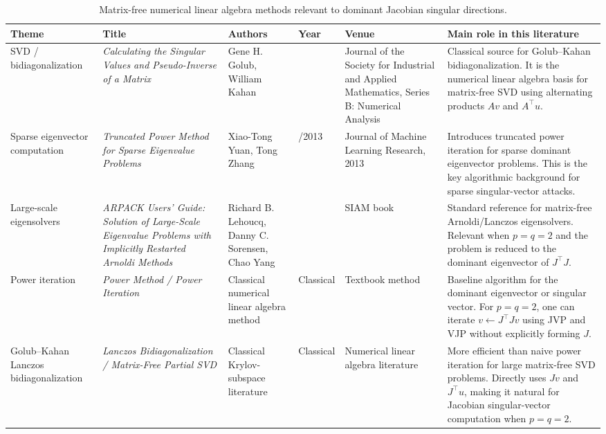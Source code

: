 \documentclass{article}
\begin{document}
\begin{landscape}
\begin{table}[p]
\centering
\footnotesize
\begin{tabular}{>{\raggedright\arraybackslash}p{2.4cm} >{\raggedright\arraybackslash}p{4.0cm} >{\raggedright\arraybackslash}p{3.4cm} >{\raggedright\arraybackslash}p{1.0cm} >{\raggedright\arraybackslash}p{3.2cm} >{\raggedright\arraybackslash}p{6.2cm}}
\hline
\textbf{Theme} & \textbf{Title} & \textbf{Authors} & \textbf{Year} & \textbf{Venue} & \textbf{Main role in this literature} \\
\hline
SVD / bidiagonalization &
\textit{Calculating the Singular Values and Pseudo-Inverse of a Matrix} &
Gene H. Golub, William Kahan &
1965 &
Journal of the Society for Industrial and Applied Mathematics, Series B: Numerical Analysis &
Classical source for Golub--Kahan bidiagonalization. It is the numerical linear algebra basis for matrix-free SVD using alternating products \(Av\) and \(A^\top u\). \\
\hline
Sparse eigenvector computation &
\textit{Truncated Power Method for Sparse Eigenvalue Problems} &
Xiao-Tong Yuan, Tong Zhang &
2011/2013 &
Journal of Machine Learning Research, 2013 &
Introduces truncated power iteration for sparse dominant eigenvector problems. This is the key algorithmic background for sparse singular-vector attacks. \\
\hline
Large-scale eigensolvers &
\textit{ARPACK Users' Guide: Solution of Large-Scale Eigenvalue Problems with Implicitly Restarted Arnoldi Methods} &
Richard B. Lehoucq, Danny C. Sorensen, Chao Yang &
1998 &
SIAM book &
Standard reference for matrix-free Arnoldi/Lanczos eigensolvers. Relevant when \(p=q=2\) and the problem is reduced to the dominant eigenvector of \(J^\top J\). \\
\hline
Power iteration &
\textit{Power Method / Power Iteration} &
Classical numerical linear algebra method &
Classical &
Textbook method &
Baseline algorithm for the dominant eigenvector or singular vector. For \(p=q=2\), one can iterate \(v \leftarrow J^\top Jv\) using JVP and VJP without explicitly forming \(J\). \\
\hline
Golub--Kahan Lanczos bidiagonalization &
\textit{Lanczos Bidiagonalization / Matrix-Free Partial SVD} &
Classical Krylov-subspace literature &
Classical &
Numerical linear algebra literature &
More efficient than naive power iteration for large matrix-free SVD problems. Directly uses \(Jv\) and \(J^\top u\), making it natural for Jacobian singular-vector computation when \(p=q=2\). \\
\hline
\end{tabular}
\caption{Matrix-free numerical linear algebra methods relevant to dominant Jacobian singular directions.}
\end{table}
\end{landscape}
\end{document}
